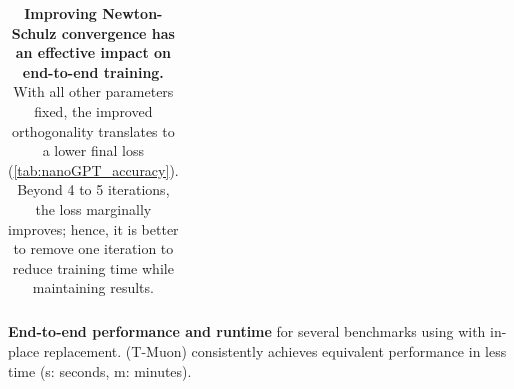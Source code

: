 \begin{table}[t]
\begin{subtable}{0.51\linewidth}
\begin{tabular}{p{40pt}p{34pt}p{22pt}p{60pt}}
        \bottomrule
        \end{tabular}
        \vspace{5mm}
    \caption{\textbf{End-to-end performance and runtime} for several benchmarks using \turbomuon with in-place replacement. \turbomuon (T-Muon) consistently achieves equivalent performance in less time (s: seconds, m: minutes).}
    \label{tab:end2endperf}
    \end{subtable}
\caption{\textbf{Improving Newton-Schulz convergence has an effective impact on end-to-end training.} With all other parameters fixed, the improved orthogonality translates to a lower final loss (\cref{tab:nanoGPT_accuracy}). Beyond 4 to 5 iterations, the loss marginally improves; hence, it is better to remove one iteration to reduce training time while maintaining results.}
\end{table}

